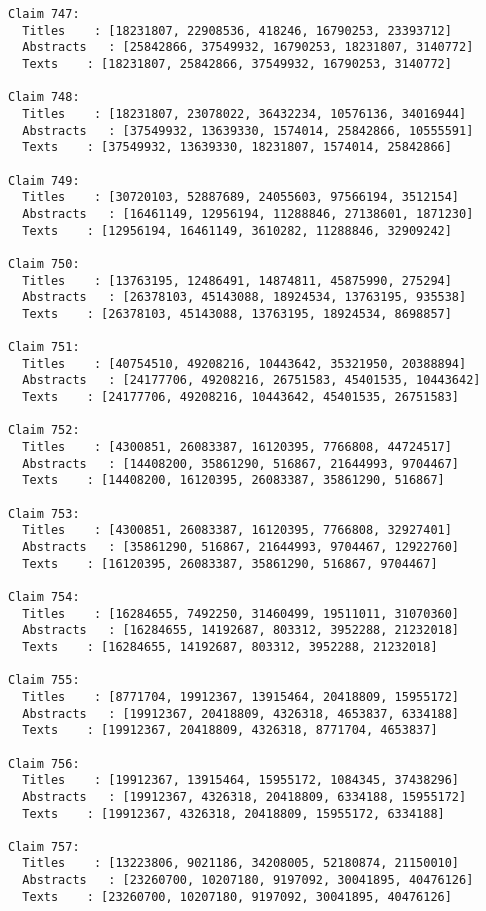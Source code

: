 \documentclass[11pt]{article}
\begin{document}
\begin{Verbatim}[commandchars=\\\{\}]
Claim 747:
  Titles    : [18231807, 22908536, 418246, 16790253, 23393712]
  Abstracts   : [25842866, 37549932, 16790253, 18231807, 3140772]
  Texts    : [18231807, 25842866, 37549932, 16790253, 3140772]

Claim 748:
  Titles    : [18231807, 23078022, 36432234, 10576136, 34016944]
  Abstracts   : [37549932, 13639330, 1574014, 25842866, 10555591]
  Texts    : [37549932, 13639330, 18231807, 1574014, 25842866]

Claim 749:
  Titles    : [30720103, 52887689, 24055603, 97566194, 3512154]
  Abstracts   : [16461149, 12956194, 11288846, 27138601, 1871230]
  Texts    : [12956194, 16461149, 3610282, 11288846, 32909242]

Claim 750:
  Titles    : [13763195, 12486491, 14874811, 45875990, 275294]
  Abstracts   : [26378103, 45143088, 18924534, 13763195, 935538]
  Texts    : [26378103, 45143088, 13763195, 18924534, 8698857]

Claim 751:
  Titles    : [40754510, 49208216, 10443642, 35321950, 20388894]
  Abstracts   : [24177706, 49208216, 26751583, 45401535, 10443642]
  Texts    : [24177706, 49208216, 10443642, 45401535, 26751583]

Claim 752:
  Titles    : [4300851, 26083387, 16120395, 7766808, 44724517]
  Abstracts   : [14408200, 35861290, 516867, 21644993, 9704467]
  Texts    : [14408200, 16120395, 26083387, 35861290, 516867]

Claim 753:
  Titles    : [4300851, 26083387, 16120395, 7766808, 32927401]
  Abstracts   : [35861290, 516867, 21644993, 9704467, 12922760]
  Texts    : [16120395, 26083387, 35861290, 516867, 9704467]

Claim 754:
  Titles    : [16284655, 7492250, 31460499, 19511011, 31070360]
  Abstracts   : [16284655, 14192687, 803312, 3952288, 21232018]
  Texts    : [16284655, 14192687, 803312, 3952288, 21232018]

Claim 755:
  Titles    : [8771704, 19912367, 13915464, 20418809, 15955172]
  Abstracts   : [19912367, 20418809, 4326318, 4653837, 6334188]
  Texts    : [19912367, 20418809, 4326318, 8771704, 4653837]

Claim 756:
  Titles    : [19912367, 13915464, 15955172, 1084345, 37438296]
  Abstracts   : [19912367, 4326318, 20418809, 6334188, 15955172]
  Texts    : [19912367, 4326318, 20418809, 15955172, 6334188]

Claim 757:
  Titles    : [13223806, 9021186, 34208005, 52180874, 21150010]
  Abstracts   : [23260700, 10207180, 9197092, 30041895, 40476126]
  Texts    : [23260700, 10207180, 9197092, 30041895, 40476126]


\end{Verbatim}
\end{document}
